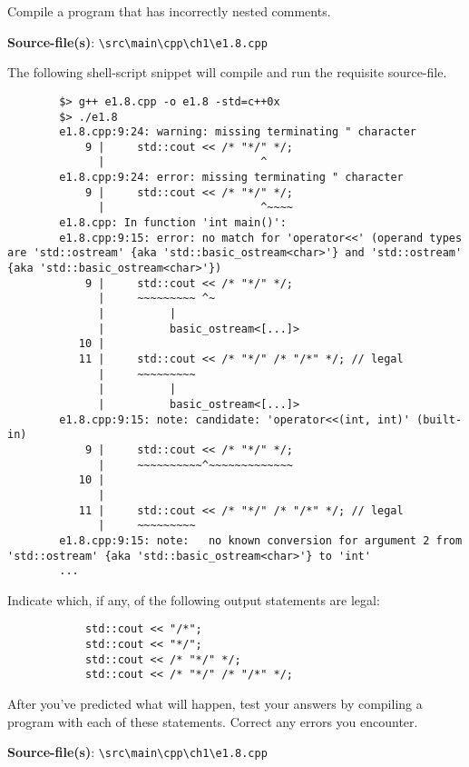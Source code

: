 \documentclass[12pt, a4paper]{article}
\begin{document}
    \bigskip
    \begin{tcolorbox}[title={Exercise: 1.7}]
        Compile a program that has incorrectly nested comments.
    \end{tcolorbox}
    \noindent\textbf{Source-file(s)}: \texttt{\textbackslash src\textbackslash main\textbackslash cpp\textbackslash ch1\textbackslash e1.8.cpp}

    \noindent The following shell-script snippet will compile and run the requisite source-file.
    \begin{verbatim}
        $> g++ e1.8.cpp -o e1.8 -std=c++0x
        $> ./e1.8
        e1.8.cpp:9:24: warning: missing terminating " character
            9 |     std::cout << /* "*/" */;
              |                        ^
        e1.8.cpp:9:24: error: missing terminating " character
            9 |     std::cout << /* "*/" */;
              |                        ^~~~~
        e1.8.cpp: In function 'int main()':
        e1.8.cpp:9:15: error: no match for 'operator<<' (operand types are 'std::ostream' {aka 'std::basic_ostream<char>'} and 'std::ostream' {aka 'std::basic_ostream<char>'})
            9 |     std::cout << /* "*/" */;
              |     ~~~~~~~~~ ^~
              |          |
              |          basic_ostream<[...]>
           10 |
           11 |     std::cout << /* "*/" /* "/*" */; // legal
              |     ~~~~~~~~~
              |          |
              |          basic_ostream<[...]>
        e1.8.cpp:9:15: note: candidate: 'operator<<(int, int)' (built-in)
            9 |     std::cout << /* "*/" */;
              |     ~~~~~~~~~~^~~~~~~~~~~~~~
           10 |
              |
           11 |     std::cout << /* "*/" /* "/*" */; // legal
              |     ~~~~~~~~~
        e1.8.cpp:9:15: note:   no known conversion for argument 2 from 'std::ostream' {aka 'std::basic_ostream<char>'} to 'int'
        ...
    \end{verbatim}

    \bigskip
    \begin{tcolorbox}[title={Exercise: 1.8}]
        Indicate which, if any, of the following output statements are legal:
        \begin{verbatim}
            std::cout << "/*";
            std::cout << "*/";
            std::cout << /* "*/" */;
            std::cout << /* "*/" /* "/*" */;
        \end{verbatim}
        After you've predicted what will happen, test your answers by compiling a program with each of these statements.
        Correct any errors you encounter.
    \end{tcolorbox}
    \noindent\textbf{Source-file(s)}: \texttt{\textbackslash src\textbackslash main\textbackslash cpp\textbackslash ch1\textbackslash e1.8.cpp}
\end{document}
